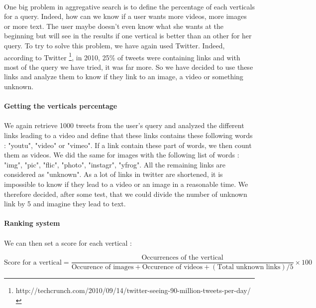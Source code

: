 \documentclass[10pt, a4paper]{article}
\begin{document}
\paragraph{}One big problem in aggregative search is to define the percentage of each verticals for a query. Indeed, how can we know if a user wants more videos, more images or more text. The user maybe doesn't even know what she wants at the beginning but will see in the results if one vertical is better than an other for her query. To try to solve this problem, we have again used Twitter. Indeed, according to Twitter \footnote{http://techcrunch.com/2010/09/14/twitter-seeing-90-million-tweets-per-day/}, in 2010, 25\% of tweets were containing links and with most of the query we have tried, it was far more. So we have decided to use these links and analyze them to know if they link to an image, a video or something unknown.

\paragraph{Getting the verticals percentage}
\paragraph{}We again retrieve 1000 tweets from the user's query and analyzed the different links leading to a video and define that these links contains these following words : "youtu", "video" or "vimeo". If a link contain these part of words, we then count them as videos. We did the same for images with the following list of words : "img", "pic", "flic", "photo", "instagr", "yfrog". All the remaining links are considered as "unknown". As a lot of links in twitter are shortened, it is impossible to know if they lead to a video or an image in a reasonable time. We therefore decided, after some test, that we could divide the number of unknown link by 5 and imagine they lead to text.

\paragraph{Ranking system}
\paragraph{}We can then set a score for each vertical : 

\[ \textrm{Score for a vertical} = \frac{\textrm{Occurrences of the vertical}}{\textrm{Occurence of images} + \textrm{Occurence of videos} + (\textrm{Total unknown links})/ 5} \times 100 \]
\end{document}
